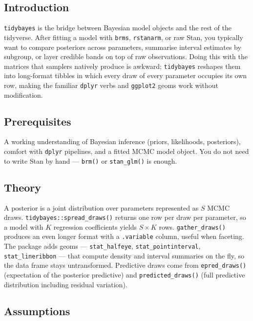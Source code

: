 \documentclass[
]{article}
\author{}
\date{\vspace{-2.5em}}
\begin{document}
\subsection{Introduction}\label{introduction}

\texttt{tidybayes} is the bridge between Bayesian model objects and the
rest of the tidyverse. After fitting a model with \texttt{brms},
\texttt{rstanarm}, or raw Stan, you typically want to compare posteriors
across parameters, summarise interval estimates by subgroup, or layer
credible bands on top of raw observations. Doing this with the matrices
that samplers natively produce is awkward; \texttt{tidybayes} reshapes
them into long-format tibbles in which every draw of every parameter
occupies its own row, making the familiar \texttt{dplyr} verbs and
\texttt{ggplot2} geoms work without modification.

\subsection{Prerequisites}\label{prerequisites}

A working understanding of Bayesian inference (priors, likelihoods,
posteriors), comfort with \texttt{dplyr} pipelines, and a fitted MCMC
model object. You do not need to write Stan by hand --- \texttt{brm()}
or \texttt{stan\_glm()} is enough.

\subsection{Theory}\label{theory}

A posterior is a joint distribution over parameters represented as \(S\)
MCMC draws. \texttt{tidybayes::spread\_draws()} returns one row per draw
per parameter, so a model with \(K\) regression coefficients yields
\(S \times K\) rows. \texttt{gather\_draws()} produces an even longer
format with a \texttt{.variable} column, useful when faceting. The
package adds geoms --- \texttt{stat\_halfeye},
\texttt{stat\_pointinterval}, \texttt{stat\_lineribbon} --- that compute
density and interval summaries on the fly, so the data frame stays
untransformed. Predictive draws come from \texttt{epred\_draws()}
(expectation of the posterior predictive) and
\texttt{predicted\_draws()} (full predictive distribution including
residual variation).

\subsection{Assumptions}\label{assumptions}
\end{document}
